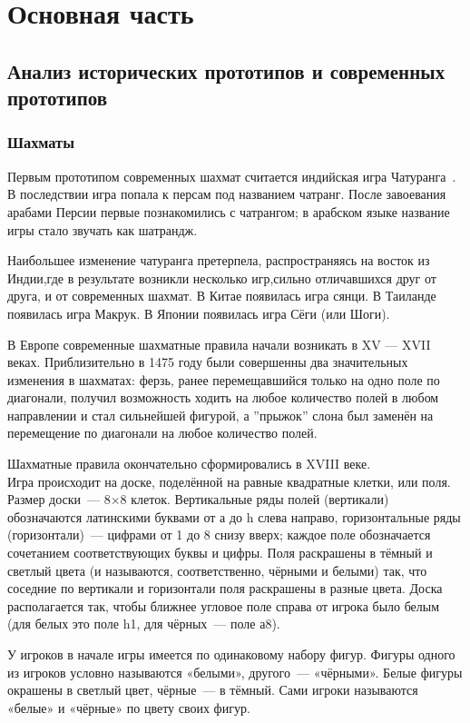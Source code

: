 \section{Основная часть}

\subsection{Анализ исторических прототипов и современных прототипов}
\subsubsection{Шахматы}
Первым прототипом современных шахмат считается индийская игра Чатуранга~\cite{web:wiki-chess-history}. В
последствии игра попала к персам под названием чатранг. После завоевания
арабами Персии первые познакомились с чатрангом; в арабском языке название игры
стало звучать как шатрандж.

Наибольшее изменение чатуранга претерпела, распространяясь на восток из
Индии,где в результате возникли несколько игр,сильно отличавшихся друг от
друга, и от современных шахмат. В Китае появилась игра сянци. В Таиланде
появилась игра Макрук. В Японии появилась игра Сёги (или Шоги).

В Европе современные шахматные правила начали возникать в XV --- XVII веках.
Приблизительно в 1475 году были совершенны два значительных изменения в
шахматах: ферзь, ранее перемещавшийся только на одно поле по диагонали, получил
возможность ходить на любое количество полей в любом направлении и стал
сильнейшей фигурой, а ''прыжок'' слона был заменён на перемещение по диагонали на
любое количество полей.

Шахматные правила окончательно сформировались в XVIII веке.\\
Игра происходит на доске, поделённой на равные квадратные клетки, или поля.
Размер доски — 8×8 клеток. Вертикальные ряды полей (вертикали) обозначаются
латинскими буквами от а до h слева направо, горизонтальные ряды (горизонтали) —
цифрами от 1 до 8 снизу вверх; каждое поле обозначается сочетанием
соответствующих буквы и цифры. Поля раскрашены в тёмный и светлый цвета (и
называются, соответственно, чёрными и белыми) так, что соседние по вертикали и
горизонтали поля раскрашены в разные цвета. Доска располагается так, чтобы
ближнее угловое поле справа от игрока было белым (для белых это поле h1, для
чёрных — поле а8).

У игроков в начале игры имеется по одинаковому набору фигур. Фигуры одного из
игроков условно называются «белыми», другого — «чёрными». Белые фигуры окрашены
в светлый цвет, чёрные — в тёмный. Сами игроки называются «белые» и «чёрные» по
цвету своих фигур.

